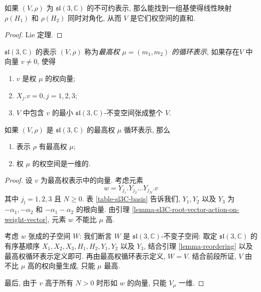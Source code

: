 \begin{proposition}
  \label{proposition-sl3C-module-as-weights-direct-sum}
  如果 \( (V, \rho) \) 为 \( \mathfrak{sl}(3, \mathbb{C}) \) 的不可约表示,
  那么能找到一组基使得线性映射 \( \rho(H_1) \) 和 \( \rho(H_2) \) 同时对角化,
  从而 \( V \) 是它们权空间的直和.
\end{proposition}
\begin{proof}
  Lie 定理.
\end{proof}
\( \mathfrak{sl}(3, \mathbb{C}) \) 的表示 \( (V, \rho) \) 称为\emph{最高权 \( \mu = (m_1,
m_2) \) 的循环表示}, 如果存在\( V \) 中向量 \( v \neq 0 \), 使得
\begin{enumerate}
  \item \( v \) 是权 \( \mu \) 的权向量;
  \item \( X_j.v = 0, j = 1, 2, 3 \);
  \item \( V \) 中包含 \( v \) 的最小 \( \mathfrak{sl}(3, \mathbb{C})
    \)-不变空间张成整个 \( V \).
\end{enumerate}

\begin{proposition}
  \label{proposition-sl3C-highest-weight-space}
  如果 \( (V, \rho) \) 是 \( \mathfrak{sl}(3, \mathbb{C}) \) 的最高权 \( \mu \)
  循环表示, 那么
  \begin{enumerate}
    \item 表示 \( \rho \) 有最高权 \( \mu \);
    \item 权 \( \mu \) 的权空间是一维的.
  \end{enumerate}
\end{proposition}
\begin{proof}
  设 \( v \) 为最高权表示中的向量. 考虑元素
  \[
    w = Y_{j_1}.Y_{j_2}\ldots Y_{j_N}.v
  \]
  其中 \( j_l = 1, 2, 3 \) 且 \( N \geq 0 \).
  表 \ref{table-sl3C-basis} 告诉我们, \(
  Y_1, Y_2 \) 以及 \( Y_3 \) 为 \( -\alpha_1, -\alpha_2 \) 和 \( -\alpha_1 -
  \alpha_2 \) 的根向量. 由引理
  \ref{lemma-sl3C-root-vector-action-on-weight-vector}, 元素 \( w \) 不能比 \(
  \mu \) 高.

  考虑 \( w \) 张成的子空间 \( W \): 我们断言 \( W \) 是 \( \mathfrak{sl}(3,
  \mathbb{C}) \)-不变子空间: 取定 \( \mathfrak{sl}(3, \mathbb{C}) \)
  的有序基顺序 \( X_1, X_2, X_3, H_1, H_2,  Y_1, Y_2 \) 以及 \( Y_3 \), 结合引理
  \ref{lemma-reordering} 以及最高权循环表示定义即可. 再由最高权循环表示定义, \(
  W = V \). 结合前段所证, \( V \) 由不比 \( \mu \) 高的权向量生成, 只能 \( \mu
  \) 最高.

  最后, 由于 \( v \) 高于所有 \( N > 0 \) 时形如 \( w \) 的向量, 只能 \( V_{\mu} \)
  一维.
\end{proof}

